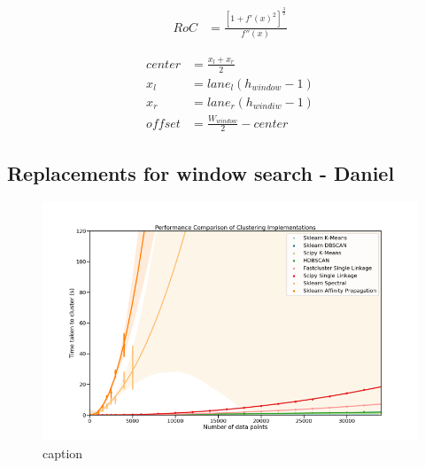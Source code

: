 \documentclass[twoside,twocolumn]{article}
\begin{document}
\begin{align} \label{eq:ROC}
RoC &= \frac{[1 + f'(x)^2]^\frac{3}{2}}{f''(x)}
\end{align}

\begin{subequations}
\begin{align} \label{eq:offset}
center &= \frac{x_{l} + x_{r}}{2} \\
x_{l} &= lane_{l}(h_{window} - 1) \\
x_{r} &= lane_{r}(h_{windiw} - 1) \\
offset &= \frac{W_{window}}{2} - center
\end{align}
\end{subequations}

\subsection{Replacements for window search - Daniel}
\begin{figure}
  \includegraphics[width=\linewidth]{daniel1.png}
  \caption{caption}
  \label{fig:d1}
\end{figure}
\end{document}
